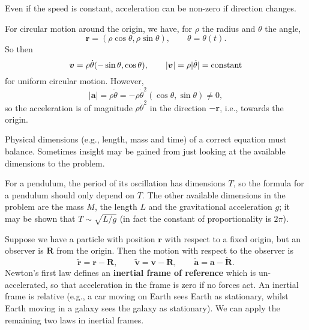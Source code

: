 \documentclass[letter-paper]{tufte-book}
\newenvironment{example}[1][Example]{\begin{trivlist}
\item[\hskip \labelsep {\bfseries #1}]}{\end{trivlist}}
\newcommand{\ab}{\boldsymbol{a}}
\newcommand{\rb}{\boldsymbol{r}}
\newcommand{\vb}{\boldsymbol{v}}
\newcommand\Def[1]{\textbf{#1}}
\begin{document}
Even if the speed is constant, acceleration can be non-zero if direction
changes.
\begin{example}
  For circular motion around the origin, we have, for $\rho$ the radius and
  $\theta$ the angle,
  \begin{equation*}
    \rb = (\rho\cos\theta, \rho\sin\theta),\qquad \theta = \theta(t).
  \end{equation*}
  So then
  \begin{equation*}
    \vb = \rho\dot{\theta}(-\sin\theta, \cos\theta),\qquad
    |\vb| = \rho|\dot{\theta}| = \textnormal{constant}
  \end{equation*}
  for uniform circular motion. However,
  \begin{equation*}
    |\ab| = \rho\dot{\theta} 
    = -\rho\dot{\theta}^2 (\cos\theta, \sin\theta) \neq 0,
  \end{equation*}
  so the acceleration is of magnitude $\rho\dot{\theta}^2$ in the direction
  $-\rb$, i.e., towards the origin.
\end{example}

Physical dimensions (e.g., length, mass and time) of a correct equation must
balance. Sometimes insight may be gained from just looking at the available
dimensions to the problem.
\begin{example}
  For a pendulum, the period of its oscillation has dimensions $T$, so the
  formula for a pendulum should only depend on $T$. The other available
  dimensions in the problem are the mass $M$, the length $L$ and the
  gravitational acceleration $g$; it may be shown that $T\sim\sqrt{L/g}$ (in
  fact the constant of proportionality is $2\pi$).
\end{example}

Suppose we have a particle with position $\rb$ with respect to a fixed origin,
but an observer is $\boldsymbol{R}$ from the origin. Then the motion with
respect to the observer is
\begin{equation*}
  \tilde{\rb} = \rb - \boldsymbol{R},\qquad
  \tilde{\vb} = \vb - \dot{\boldsymbol{R}},\qquad
  \tilde{\ab} = \ab - \ddot{\boldsymbol{R}}.
\end{equation*}
Newton's first law defines an \Def{inertial frame of reference} which is
un-accelerated, so that acceleration in the frame is zero if no forces act. An
inertial frame is relative (e.g., a car moving on Earth sees Earth as
stationary, whilst Earth moving in a galaxy sees the galaxy as stationary). We
can apply the remaining two laws in inertial frames.
\end{document}
